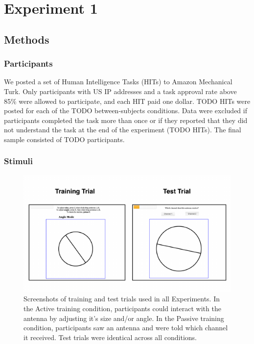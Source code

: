 \documentclass[10pt, letterpaper]{article}
\newenvironment{CodeChunk}{}{}
\begin{document}
\section{Experiment 1}\label{experiment-1}

\subsection{Methods}\label{methods}

\subsubsection{Participants}\label{participants}

We posted a set of Human Intelligence Tasks (HITs) to Amazon Mechanical
Turk. Only participants with US IP addresses and a task approval rate
above 85\% were allowed to participate, and each HIT paid one dollar.
TODO HITs were posted for each of the TODO between-subjects conditions.
Data were excluded if participants completed the task more than once or
if they reported that they did not understand the task at the end of the
experiment (TODO HITs). The final sample consisted of TODO participants.

\subsubsection{Stimuli}\label{stimuli}

\begin{CodeChunk}
\begin{figure}[tb]

{\centering \includegraphics{figs/stimuli-1} 

}

\caption[Screenshots of training and test trials used in all Experiments]{Screenshots of training and test trials used in all Experiments. In the Active training condition, participants could interact with the antenna by adjusting it's size and/or angle. In the Passive training condition, participants saw an antenna and were told which channel it received. Test trials were identical across all conditions.}\label{fig:stimuli}
\end{figure}
\end{CodeChunk}
\end{document}
